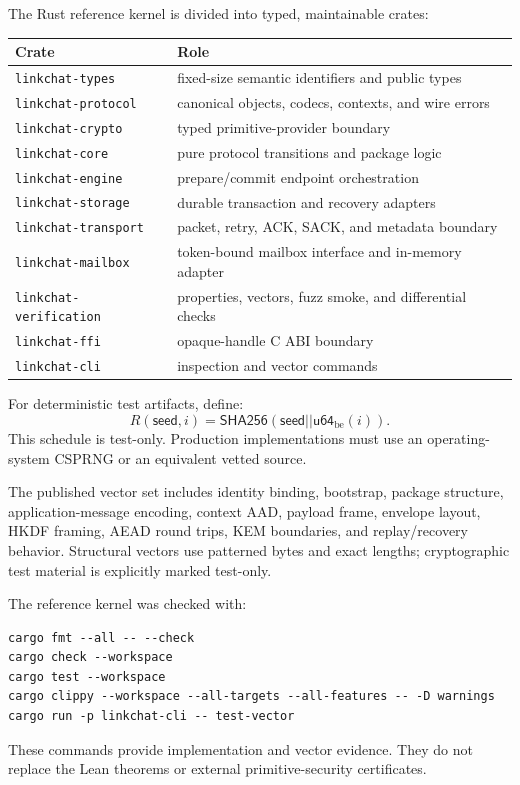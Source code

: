 \documentclass[11pt,letterpaper]{article}
\newcommand{\code}[1]{\texttt{#1}}
\begin{document}
The Rust reference kernel is divided into typed, maintainable crates:
\begin{center}
\begin{tabular}{ll}
\toprule
Crate & Role \\
\midrule
\code{linkchat-types} & fixed-size semantic identifiers and public types \\
\code{linkchat-protocol} & canonical objects, codecs, contexts, and wire errors \\
\code{linkchat-crypto} & typed primitive-provider boundary \\
\code{linkchat-core} & pure protocol transitions and package logic \\
\code{linkchat-engine} & prepare/commit endpoint orchestration \\
\code{linkchat-storage} & durable transaction and recovery adapters \\
\code{linkchat-transport} & packet, retry, ACK, SACK, and metadata boundary \\
\code{linkchat-mailbox} & token-bound mailbox interface and in-memory adapter \\
\code{linkchat-verification} & properties, vectors, fuzz smoke, and differential checks \\
\code{linkchat-ffi} & opaque-handle C ABI boundary \\
\code{linkchat-cli} & inspection and vector commands \\
\bottomrule
\end{tabular}
\end{center}

For deterministic test artifacts, define:
\[
  R(\mathsf{seed},i)=\mathsf{SHA256}(\mathsf{seed}\mathbin{||}\mathsf{u64}_{\mathrm{be}}(i)).
\]
This schedule is test-only. Production implementations must use an operating-system CSPRNG
or an equivalent vetted source.

The published vector set includes identity binding, bootstrap, package structure,
application-message encoding, context AAD, payload frame, envelope layout, HKDF framing,
AEAD round trips, KEM boundaries, and replay/recovery behavior. Structural vectors use
patterned bytes and exact lengths; cryptographic test material is explicitly marked
test-only.

The reference kernel was checked with:
\begin{lstlisting}[caption={Reference verification commands}]
cargo fmt --all -- --check
cargo check --workspace
cargo test --workspace
cargo clippy --workspace --all-targets --all-features -- -D warnings
cargo run -p linkchat-cli -- test-vector
\end{lstlisting}
These commands provide implementation and vector evidence. They do not replace the Lean
theorems or external primitive-security certificates.
\end{document}
